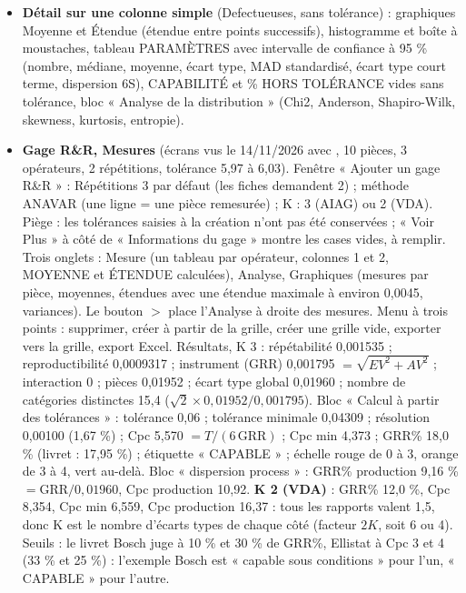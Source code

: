 \documentclass[10pt,a4paper]{article}
\begin{document}
\begin{itemize}
qu'Ellistat ne signale pas une série de 7 du même côté, et le mémo le dit. Carte U Laney (même jeu, Phase I 1 à 25) : limites en ligne brisée un peu plus larges ; calcul avec $\sigma_z = 1{,}076$ : limite du rouleau 14 à 0,1396 (0,1336 sans Laney), 0,1746 pour 40 m, 0,124 pour 120 m, lisibles à l'écran ; le rouleau 14 reste seul en rouge. Carte u (jeu des 25 rouleaux) : « Taille de lot » = Longueur\_m, « Taille de lot (si fixe) » vide ; $\bar u = 0{,}0549$ défaut par mètre, limite en ligne brisée ($\bar u + 3\sqrt{\bar u/\text{longueur}}$, environ 0,119 à 120 m et 0,166 à 40 m), seul le rouleau 14 est en rouge ($u = 0{,}1625$ contre une limite de 0,1336). Concordance avec le calcul. Une barre d'outils apparaît au survol du graphique (appareil photo, zoom, déplacement, réinitialisation).
\item \textbf{Détail sur une colonne simple} (Defectueuses, sans tolérance) : graphiques Moyenne et Étendue (étendue entre points successifs), histogramme et boîte à moustaches, tableau PARAMÈTRES avec intervalle de confiance à 95 \% (nombre, médiane, moyenne, écart type, MAD standardisé, écart type court terme, dispersion 6S), CAPABILITÉ et \% HORS TOLÉRANCE vides sans tolérance, bloc « Analyse de la distribution » (Chi2, Anderson, Shapiro-Wilk, skewness, kurtosis, entropie).
\item \textbf{Gage R\&R, Mesures} (écrans vus le 14/11/2026 avec , 10 pièces, 3 opérateurs, 2 répétitions, tolérance 5,97 à 6,03). Fenêtre « Ajouter un gage R\&R » : Répétitions 3 par défaut (les fiches demandent 2) ; méthode ANAVAR (une ligne = une pièce remesurée) ; K : 3 (AIAG) ou 2 (VDA). Piège : les tolérances saisies à la création n'ont pas été conservées ; « Voir Plus » à côté de « Informations du gage » montre les cases vides, à remplir. Trois onglets : Mesure (un tableau par opérateur, colonnes 1 et 2, MOYENNE et ÉTENDUE calculées), Analyse, Graphiques (mesures par pièce, moyennes, étendues avec une étendue maximale à environ 0,0045, variances). Le bouton $>$ place l'Analyse à droite des mesures. Menu à trois points : supprimer, créer à partir de la grille, créer une grille vide, exporter vers la grille, export Excel. Résultats, K 3 : répétabilité 0,001535 ; reproductibilité 0,0009317 ; instrument (GRR) 0,001795 $= \sqrt{EV^2 + AV^2}$ ; interaction 0 ; pièces 0,01952 ; écart type global 0,01960 ; nombre de catégories distinctes 15,4 ($\sqrt{2} \times 0{,}01952/0{,}001795$). Bloc « Calcul à partir des tolérances » : tolérance 0,06 ; tolérance minimale 0,04309 ; résolution 0,00100 (1,67 \%) ; Cpc 5,570 $= T/(6\,\mathrm{GRR})$ ; Cpc min 4,373 ; GRR\% 18,0 \% (livret : 17,95 \%) ; étiquette « CAPABLE » ; échelle rouge de 0 à 3, orange de 3 à 4, vert au-delà. Bloc « dispersion process » : GRR\% production 9,16 \% $= \mathrm{GRR}/0{,}01960$, Cpc production 10,92. \textbf{K 2 (VDA)} : GRR\% 12,0 \%, Cpc 8,354, Cpc min 6,559, Cpc production 16,37 : tous les rapports valent 1,5, donc K est le nombre d'écarts types de chaque côté (facteur $2K$, soit 6 ou 4). Seuils : le livret Bosch juge à 10 \% et 30 \% de GRR\%, Ellistat à Cpc 3 et 4 (33 \% et 25 \%) : l'exemple Bosch est « capable sous conditions » pour l'un, « CAPABLE » pour l'autre.

\end{itemize}
\end{document}

